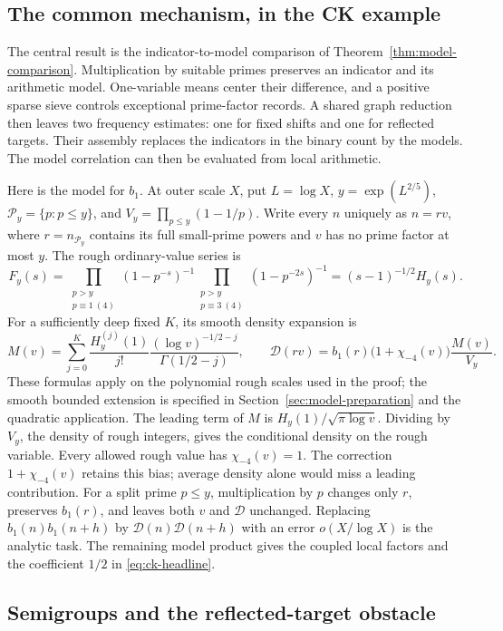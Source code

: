 \subsection{The common mechanism, in the CK example}

The central result is the indicator-to-model comparison of
Theorem~\ref{thm:model-comparison}. Multiplication by suitable primes
preserves an indicator and its arithmetic model. One-variable means
center their difference, and a positive sparse sieve controls exceptional
prime-factor records. A shared graph reduction then leaves two frequency
estimates: one for fixed shifts and one for reflected targets. Their
assembly replaces the indicators in the binary count by the models.
The model correlation can then be evaluated from local arithmetic.

Here is the model for \(b_1\). At outer scale \(X\), put
\(L=\log X\), \(y=\exp(L^{2/5})\),
\(\mathcal P_y=\{p:p\le y\}\), and
\(V_y=\prod_{p\le y}(1-1/p)\). Write every \(n\) uniquely as
\(n=rv\), where \(r=n_{\mathcal P_y}\) contains its full small-prime
powers and \(v\) has no prime factor at most \(y\).
The rough ordinary-value series is
\[
 F_y(s)=\prod_{\substack{p>y\\p\equiv1\ (4)}}(1-p^{-s})^{-1}
         \prod_{\substack{p>y\\p\equiv3\ (4)}}(1-p^{-2s})^{-1}
       =(s-1)^{-1/2}H_y(s).
\]
For a sufficiently deep fixed \(K\), its smooth density expansion is
\[
 M(v)=\sum_{j=0}^K\frac{H_y^{(j)}(1)}{j!}
            \frac{(\log v)^{-1/2-j}}{\Gamma(1/2-j)},\qquad
 \mathcal D(rv)=b_1(r)\bigl(1+\chi_{-4}(v)\bigr)\frac{M(v)}{V_y}.
\]
These formulas apply on the polynomial rough scales used in the proof;
the smooth bounded extension is specified in
Section~\ref{sec:model-preparation} and the quadratic application.
The leading term of \(M\) is \(H_y(1)/\sqrt{\pi\log v}\).
Dividing by \(V_y\), the density of rough integers, gives the
conditional density on the rough variable. Every allowed rough value
has \(\chi_{-4}(v)=1\). The correction \(1+\chi_{-4}(v)\)
retains this bias; average density alone would miss a leading contribution.
For a split prime \(p\le y\), multiplication by \(p\) changes only
\(r\), preserves \(b_1(r)\), and leaves both \(v\) and
\(\mathcal D\) unchanged. Replacing
\(b_1(n)b_1(n+h)\) by \(\mathcal D(n)\mathcal D(n+h)\)
with an error \(o(X/\log X)\) is the analytic task. The remaining
model product gives the coupled local factors and the coefficient
\(1/2\) in \eqref{eq:ck-headline}.

\subsection{Semigroups and the reflected-target obstacle}

